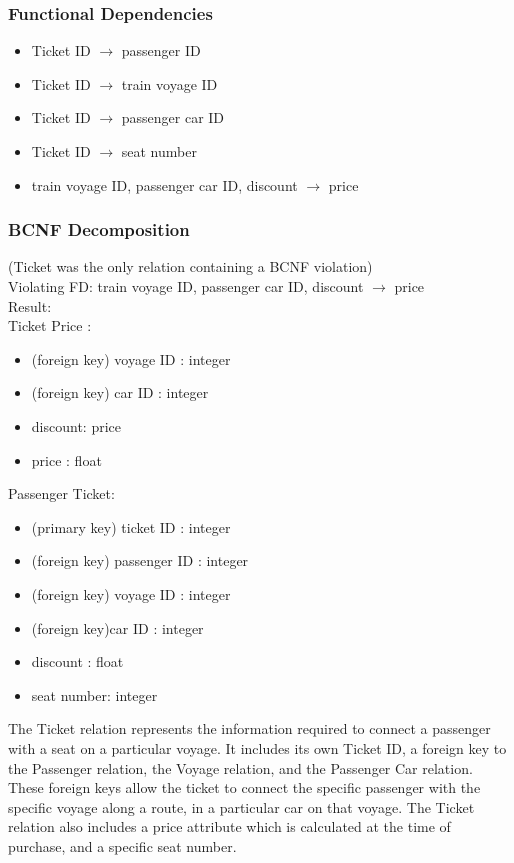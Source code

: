 \documentclass[a4paper]{article}
\begin{document}
\subsubsection*{Functional Dependencies}
\begin{itemize}
\item Ticket ID $\rightarrow$ passenger ID
\item Ticket ID $\rightarrow$ train voyage ID
\item Ticket ID $\rightarrow$ passenger car ID
\item Ticket ID $\rightarrow$ seat number
\item train voyage ID, passenger car ID, discount $\rightarrow$ price
\end{itemize}

\subsubsection*{BCNF Decomposition} 
(Ticket was the only relation containing a BCNF violation)\\
Violating FD: train voyage ID, passenger car ID, discount $\rightarrow$ price\\
Result:\\
Ticket Price :
\begin{itemize}
\item (foreign key) voyage ID : integer
\item (foreign key) car ID : integer
\item discount: price
\item price : float 
\end{itemize}
Passenger Ticket:
\begin{itemize}
\item (primary key) ticket ID : integer
\item (foreign key) passenger ID : integer
\item (foreign key) voyage ID : integer
\item (foreign key)car ID : integer
\item discount : float
\item seat number: integer
\end{itemize}

The Ticket relation represents the information required to connect a passenger with a seat on a particular voyage. It includes its own Ticket ID, a foreign key to the Passenger relation, the Voyage relation, and the Passenger Car relation. These foreign keys allow the ticket to connect the specific passenger with the specific voyage along a route, in a particular car on that voyage. The Ticket relation also includes a price attribute which is calculated at the time of purchase, and a specific seat number.
\end{document}
